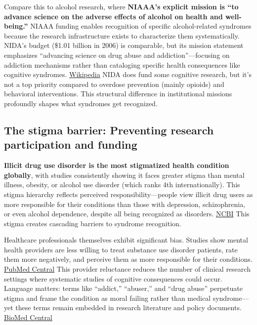 Compare this to alcohol research, where \textbf{NIAAA's explicit mission is ``to advance science on the adverse effects of alcohol on health and well-being.''} NIAAA funding enables recognition of specific alcohol-related syndromes because the research infrastructure exists to characterize them systematically. NIDA's budget (\$1.01 billion in 2006) is comparable, but its mission statement emphasizes ``advancing science on drug abuse and addiction''---focusing on addiction mechanisms rather than cataloging specific health consequences like cognitive syndromes. \href{https://en.wikipedia.org/wiki/National_Institute_on_Drug_Abuse}{Wikipedia} NIDA does fund some cognitive research, but it's not a top priority compared to overdose prevention (mainly opioids) and behavioral interventions. This structural difference in institutional missions profoundly shapes what syndromes get recognized.

\subsection{The stigma barrier: Preventing research participation and funding}\label{16_missing_syndrome-the-stigma-barrier-preventing-research-participation-and-funding}

\textbf{Illicit drug use disorder is the most stigmatized health condition globally}, with studies consistently showing it faces greater stigma than mental illness, obesity, or alcohol use disorder (which ranks 4th internationally). This stigma hierarchy reflects perceived responsibility---people view illicit drug users as more responsible for their conditions than those with depression, schizophrenia, or even alcohol dependence, despite all being recognized as disorders. \href{https://www.ncbi.nlm.nih.gov/books/NBK384923/}{NCBI} This stigma creates cascading barriers to syndrome recognition.

Healthcare professionals themselves exhibit significant bias. Studies show mental health providers are less willing to treat substance use disorder patients, rate them more negatively, and perceive them as more responsible for their conditions. \href{https://pmc.ncbi.nlm.nih.gov/articles/PMC5854406/}{PubMed Central} This provider reluctance reduces the number of clinical research settings where systematic studies of cognitive consequences could occur. Language matters: terms like ``addict,'' ``abuser,'' and ``drug abuse'' perpetuate stigma and frame the condition as moral failing rather than medical syndrome---yet these terms remain embedded in research literature and policy documents. \href{https://substanceabusepolicy.biomedcentral.com/articles/10.1186/s13011-020-00288-0}{BioMed Central}

